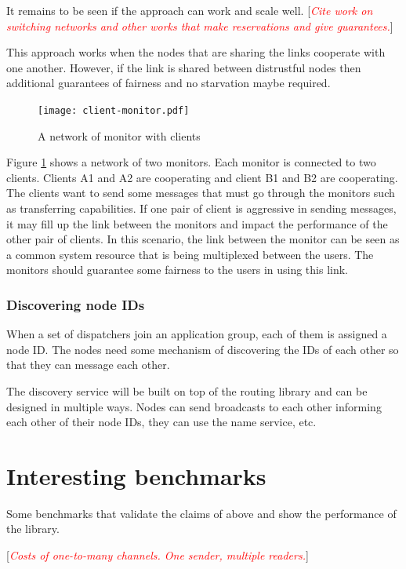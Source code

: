 \documentclass[a4paper,twoside]{report} %
\newcommand{\note}[1]{[\textcolor{red}{\textit{#1}}]}
\begin{document}
It remains to be seen if the approach can work and scale well.
\note{Cite work on switching networks and other works that make reservations and
  give guarantees.}

This approach works when the nodes that are sharing the links
cooperate with one another.
However, if the link is shared between distrustful
nodes then additional guarantees of fairness and no starvation maybe required.

\begin{figure}[t]
 \texttt{[image: client-monitor.pdf]}
 \caption{A network of monitor with clients}\label{fig:client-monitor}
\end{figure}

Figure \ref{fig:client-monitor} shows a network of two monitors.
Each monitor is connected to two clients.
Clients A1 and A2 are cooperating and client B1 and B2 are cooperating.
The clients want to send some messages that must go through the monitors such as
transferring capabilities.
If one pair of client is aggressive in sending messages,
it may fill up the link between the monitors and impact the performance
of the other pair of clients.
In this scenario, the link between the monitor can be seen
as a common system resource that is being multiplexed between the users.
The monitors should guarantee some fairness to the users in using this link.

\subsection{Discovering node IDs}
When a set of dispatchers join an application group,
each of them is assigned a node ID.
The nodes need some mechanism of discovering the IDs of each other
so that they can message each other.

The discovery service will be built on top of the routing library
and can be designed in multiple ways.
Nodes can send broadcasts to each other informing each other of their node IDs,
they can use the name service, etc.

\chapter{Interesting benchmarks}\label{chap:benchmarks}

Some benchmarks that validate the claims of above and show the performance of the library.

\note{Costs of one-to-many channels. One sender, multiple readers.}
\end{document}
